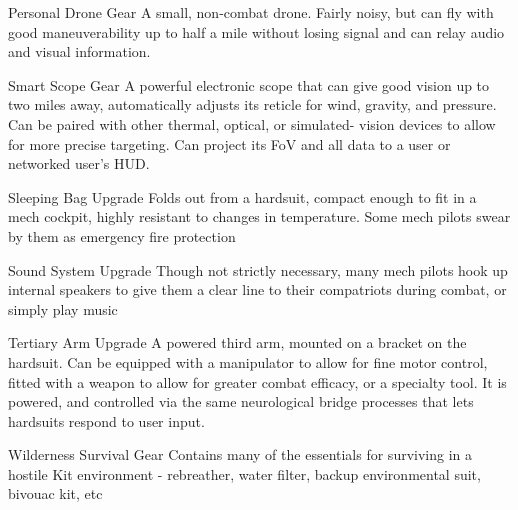 Personal Drone                Gear           A small, non-combat drone. Fairly noisy, but can fly with good  
                                             maneuverability up to half a mile without losing signal and can  
                                             relay audio and visual information. 

Smart Scope                   Gear           A powerful electronic scope that can give good vision up to two  
                                             miles away, automatically adjusts its reticle for wind, gravity, and  
                                             pressure. Can be paired with other thermal, optical, or simulated- 
                                             vision devices to allow for more precise targeting. Can project its  
                                             FoV and all data to a user or networked user’s HUD.   

Sleeping Bag                  Upgrade        Folds out from a hardsuit, compact enough to fit in a mech  
                                             cockpit, highly resistant to changes in temperature. Some mech  
                                             pilots swear by them as emergency fire protection 

Sound System                  Upgrade        Though not strictly necessary, many mech pilots hook up internal  
                                             speakers to give them a clear line to their compatriots during  
                                             combat, or simply play music 

Tertiary Arm                  Upgrade        A powered third arm, mounted on a bracket on the hardsuit. Can  
                                             be equipped with a manipulator to allow for fine motor control,  
                                             fitted with a weapon to allow for greater combat efficacy, or a  
                                             specialty tool. It is powered, and controlled via the same  
                                             neurological bridge processes that lets hardsuits respond to user  
                                             input.  

Wilderness Survival           Gear           Contains many of the essentials for surviving in a hostile  
Kit                                          environment - rebreather, water filter, backup environmental suit,  
                                             bivouac kit, etc 

                                                                                                                         